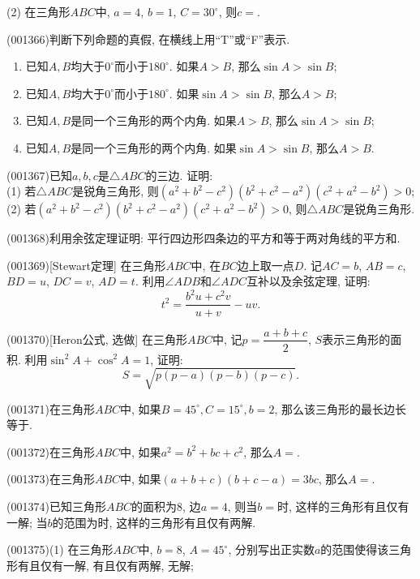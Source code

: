 (2) 在三角形$ABC$中, $a=4$, $b=1$, $C=30^\circ$, 则$c=$.
\item (001366)判断下列命题的真假, 在横线上用``{\rm T}''或``{\rm F}''表示.
\begin{enumerate}[\blank{30}(1)]
\item 已知$A,B$均大于$0^\circ$而小于$180^\circ$. 如果$A>B$, 那么$\sin A>\sin B$;\\ 
\item 已知$A,B$均大于$0^\circ$而小于$180^\circ$. 如果$\sin A>\sin B$, 那么$ A> B$;\\ 
\item 已知$A,B$是同一个三角形的两个内角. 如果$A>B$, 那么$\sin A>\sin B$;\\ 
\item 已知$A,B$是同一个三角形的两个内角. 如果$\sin A>\sin B$, 那么$A>B$.\\ 
\end{enumerate}
\item (001367)已知$a,b,c$是$\triangle ABC$的三边. 证明: \\ 
(1) 若$\triangle ABC$是锐角三角形, 则$(a^2+b^2-c^2)(b^2+c^2-a^2)(c^2+a^2-b^2)>0$;\\ 
(2) 若$(a^2+b^2-c^2)(b^2+c^2-a^2)(c^2+a^2-b^2)>0$, 则$\triangle ABC$是锐角三角形.
\item (001368)利用余弦定理证明: 平行四边形四条边的平方和等于两对角线的平方和.
\item (001369)[Stewart定理]
在三角形$ABC$中, 在$BC$边上取一点$D$. 记$AC=b$, $AB=c$, $BD=u$, $DC=v$, $AD=t$. 利用$\angle ADB$和$\angle ADC$互补以及余弦定理, 证明:
$$t^2=\dfrac{b^2u+c^2v}{u+v}-uv.$$
\item (001370)[Heron公式, 选做]
在三角形$ABC$中, 记$p=\dfrac{a+b+c}{2}$, $S$表示三角形的面积. 利用$\sin^2A+\cos^2A=1$, 证明:
$$S=\sqrt{p(p-a)(p-b)(p-c)}.$$
\item (001371)在三角形$ABC$中, 如果$B=45^\circ, C=15^\circ, b=2$, 那么该三角形的最长边长等于.
\item (001372)在三角形$ABC$中, 如果$a^2=b^2+bc+c^2$, 那么$A=$.
\item (001373)在三角形$ABC$中, 如果$(a+b+c)(b+c-a)=3bc$, 那么$A=$.
\item (001374)已知三角形$ABC$的面积为$8$, 边$a=4$, 则当$b=$时, 这样的三角形有且仅有一解; 当$b$的范围为时, 这样的三角形有且仅有两解.
\item (001375)(1) 在三角形$ABC$中, $b=8$, $A=45^\circ$, 分别写出正实数$a$的范围使得该三角形有且仅有一解, 有且仅有两解, 无解;\\ 
